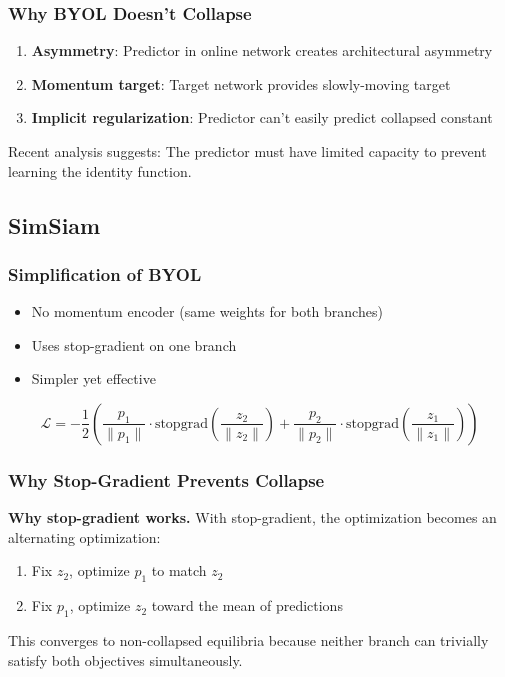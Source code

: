 \subsubsection{Why BYOL Doesn't Collapse}

\begin{enumerate}
    \item \textbf{Asymmetry}: Predictor in online network creates architectural asymmetry
    \item \textbf{Momentum target}: Target network provides slowly-moving target
    \item \textbf{Implicit regularization}: Predictor can't easily predict collapsed constant
\end{enumerate}

Recent analysis suggests: The predictor must have limited capacity to prevent learning the identity function.

\subsection{SimSiam}

\subsubsection{Simplification of BYOL}

\begin{itemize}
    \item No momentum encoder (same weights for both branches)
    \item Uses stop-gradient on one branch
    \item Simpler yet effective
\end{itemize}

\begin{equation}
\mathcal{L} = -\frac{1}{2}\left(\frac{p_1}{\|p_1\|} \cdot \text{stopgrad}\left(\frac{z_2}{\|z_2\|}\right) + \frac{p_2}{\|p_2\|} \cdot \text{stopgrad}\left(\frac{z_1}{\|z_1\|}\right)\right)
\end{equation}

\subsubsection{Why Stop-Gradient Prevents Collapse}

\textbf{Why stop-gradient works.} With stop-gradient, the optimization becomes an alternating optimization:
\begin{enumerate}
    \item Fix $z_2$, optimize $p_1$ to match $z_2$
    \item Fix $p_1$, optimize $z_2$ toward the mean of predictions
\end{enumerate}
This converges to non-collapsed equilibria because neither branch can trivially satisfy both objectives simultaneously.

